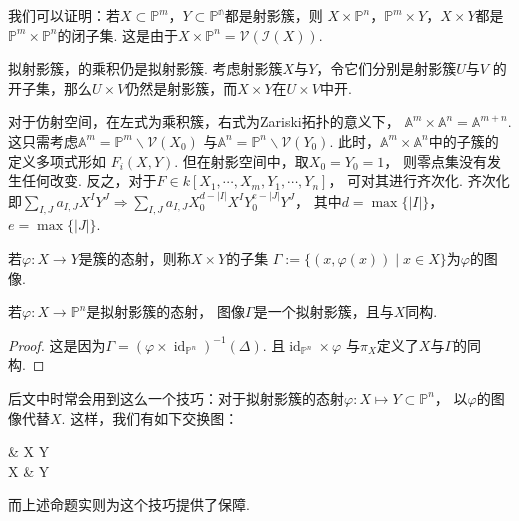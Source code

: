     我们可以证明：若$X \subset \mathbb{P}^{m}$，$Y \subset \mathbb{P^{n}}$都是射影簇，则
    $X \times \mathbb{P}^{n}$，$\mathbb{P}^{m} \times Y$，$X \times Y$都是
    $\mathbb{P}^{m} \times \mathbb{P}^{n}$的闭子集. 
    这是由于$X \times \mathbb{P}^{n} = \mathcal{V}(\mathcal{I}(X))$.

    \begin{remark}
        拟射影簇，的乘积仍是拟射影簇. 考虑射影簇$X$与$Y$，令它们分别是射影簇$U$与$V$
        的开子集，那么$U \times V$仍然是射影簇，而$X \times Y$在$U \times V$中开.
    \end{remark}

    \begin{remark}
        对于仿射空间，在左式为乘积簇，右式为Zariski拓扑的意义下，
        $\mathbb{A}^{m} \times \mathbb{A}^{n} = \mathbb{A}^{m+n}$.
        这只需考虑$\mathbb{A}^{m}=\mathbb{P}^{m} \backslash \mathcal{V}(X_{0})$
        与$\mathbb{A}^{n}=\mathbb{P}^{n} \backslash \mathcal{V}(Y_{0})$.
        此时，$\mathbb{A}^{m} \times \mathbb{A}^{n}$中的子簇的定义多项式形如
        $F_{i}(X,Y)$. 但在射影空间中，取$X_{0}=Y_{0}=1$，
        则零点集没有发生任何改变. 反之，对于$F \in k[X_{1},\cdots,X_{m},Y_{1},\cdots,Y_{n}]$，
        可对其进行齐次化.
        齐次化即$\sum_{I,J}a_{I,J}X^{I}Y^{J} \Rightarrow 
        \sum_{I,J}a_{I,J}X_{0}^{d-|I|}X^{I}Y_{0}^{e-|J|}Y^{J}$，
        其中$d = \max\{|I|\}$，$e = \max\{|J|\}$.
    \end{remark}

    \begin{definition}[图像（Graph）]
        若$\varphi\colon X \rightarrow Y$是簇的态射，则称$X \times Y$的子集
        $\Gamma:=\{(x,\varphi(x)) \mid x \in X\}$为$\varphi$的图像. 
    \end{definition}

    \begin{proposition}
        若$\varphi\colon X \rightarrow \mathbb{P}^{n}$是拟射影簇的态射，
        图像$\Gamma$是一个拟射影簇，且与$X$同构.
    \end{proposition}
    \begin{proof}
        这是因为$\Gamma = 
        (\varphi \times \operatorname{id}_{\mathbb{P}^{n}})^{-1}(\Delta)$.
        且$\operatorname{id}_{\mathbb{P}^{n}} \times \varphi$
        与$\pi_{X}$定义了$X$与$\Gamma$的同构.
    \end{proof}

    \begin{remark}
        后文中时常会用到这么一个技巧：对于拟射影簇的态射$\varphi\colon X \mapsto Y \subset \mathbb{P}^{n}$，
        以$\varphi$的图像代替$X$. 这样，我们有如下交换图：
        \begin{cd}
            \Gamma \ar[r, hook]         & X \times Y \ar[d, "\pi_{Y}"] \\
            X \ar[r] \ar[u, "\cong"] & Y                              
        \end{cd}
        而上述命题实则为这个技巧提供了保障.
    \end{remark}

